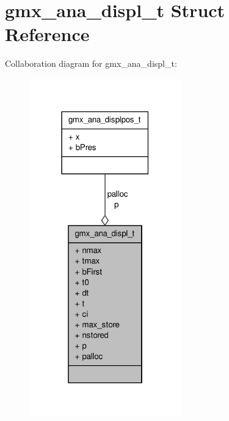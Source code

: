 \hypertarget{structgmx__ana__displ__t}{\section{gmx\-\_\-ana\-\_\-displ\-\_\-t \-Struct \-Reference}
\label{structgmx__ana__displ__t}
}


\-Collaboration diagram for gmx\-\_\-ana\-\_\-displ\-\_\-t\-:
\nopagebreak
\begin{figure}[H]
\begin{center}
\leavevmode
\includegraphics[width=186pt]{structgmx__ana__displ__t__coll__graph}
\end{center}
\end{figure}
